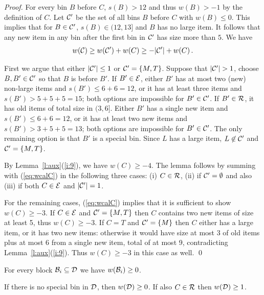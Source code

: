 \begin{proof}
For every bin $B$ before $C$, $s(B)>12$ and thus $w(B)>-1$ by the
definition of $C$. Let ${\mathcal C'}$ be the set of all bins $B$ before $C$ with
$w(B)\leq0$. This implies that for $B\in{\mathcal C'}$, $s(B)\in(12,13]$
and $B$ has no large item. It follows that any new item in any
bin after the first bin in ${\mathcal C'}$ has size more than $5$.
We have 
\begin{equation}
\label{eq:wcalC}
w({\mathcal C})\geq w({\mathcal C'})+w(C)\geq-|{\mathcal C'}|+w(C)\,.
\end{equation} 

First we argue that either $|{\mathcal C'}|\leq 1$ or ${\mathcal C'}=\{M,T\}$.
Suppose that $|\Cprime|>1$, choose $B,B'\in{\mathcal C'}$ so that $B$ is before
$B'$.  If $B'\in{\mathcal E}$, either $B'$ has at most two (new) non-large items and
$s(B')\leq 6+6= 12$, or it has at least three items and
$s(B')>5+5+5=15$; both options are impossible for $B'\in{\mathcal C'}$.
If $B'\in{\mathcal R}$, it has old items of total size in
$(3,6]$. Either $B'$ has a single new item and $s(B')\leq 6+6= 12$, or
it has at least two new items and $s(B')>3+5+5=13$; both options
are impossible for $B'\in {\mathcal C'}$. 
The only remaining
option is that $B'$ is a special bin. Since $L$ has a large item,
$L\not\in{\mathcal C'}$ and ${\mathcal C'}=\{M,T\}$.

By Lemma~\ref{l:aux}(\ref{i:9}), we have $w(C)\geq -4$. The lemma
follows by summing with (\ref{eq:wcalC}) in the following three cases: (i)
$C\in{\mathcal R}$, (ii) if ${\mathcal C'}=\emptyset$ and also (iii) if
both $C\in{\mathcal E}$ and $|{\mathcal C'}|=1$.

For the remaining cases, (\ref{eq:wcalC}) implies that it is
sufficient to show $w(C)\geq -3$. 
If $C\in{\mathcal E}$ and ${\mathcal C'}=\{M,T\}$ then $C$ contains two new items of
size at least 5, thus $w(C)\geq -3$.
%
If $C=T$ and ${\mathcal C'}=\{M\}$ then $C$ either has a large item, or it
has two new items: otherwise it would have size at most 3 of old items
plus at most 6 from a single new item, total of at most 9,
contradicting Lemma~\ref{l:aux}(\ref{i:9}). Thus $w(C)\geq -3$ in this
case as well.
\qed
\end{proof}

\begin{lem}
\label{l:d} 
\begin{compactenum}[\rm(i)]
\item 
For every block ${\mathcal B}_i\subseteq{\mathcal D}$ we have $w({\mathcal B}_i)\geq 0$.
\item 
If there is no special bin in ${\mathcal D}$, then $w({\mathcal D})\geq 0$.
If also $C\in{\mathcal R}$ then $w({\mathcal D})\geq 1$.
\end{compactenum}
\end{lem}

